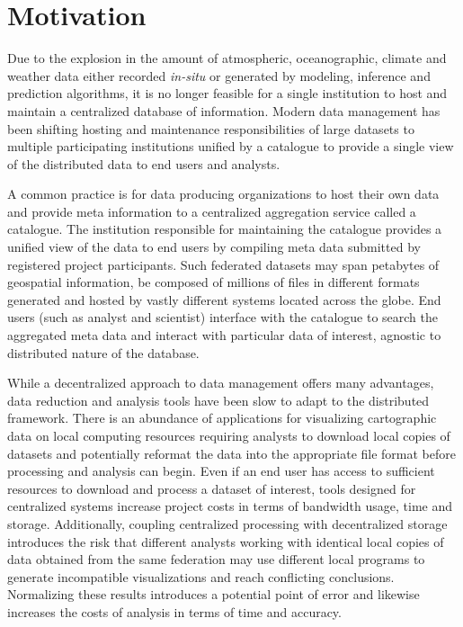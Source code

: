 \section{Motivation}
\label{sec:motivation}
Due to the explosion in the amount of atmospheric, oceanographic,
climate and weather data either recorded \emph{in-situ} or generated
by modeling, inference and prediction algorithms, it is no longer
feasible for a single institution to host and maintain a centralized
database of information. Modern data management has been shifting
hosting and maintenance responsibilities of large datasets to multiple
participating institutions unified by a catalogue to provide a single
view of the distributed data to end users and analysts.

A common practice is for data producing organizations to host their
own data and provide meta information to a centralized aggregation
service called a catalogue. The institution responsible for
maintaining the catalogue provides a unified view of the data to end
users by compiling meta data submitted by registered project
participants. Such federated datasets may span petabytes of geospatial
information, be composed of millions of files in different formats
generated and hosted by vastly different systems located across the
globe. End users (such as analyst and scientist) interface with the
catalogue to search the aggregated meta data and interact with
particular data of interest, agnostic to distributed nature of the
database.

While a decentralized approach to data management offers many
advantages, data reduction and analysis tools have been slow to adapt
to the distributed framework. There is an abundance of applications
for visualizing cartographic data on local computing resources
requiring analysts to download local copies of datasets and
potentially reformat the data into the appropriate file format before
processing and analysis can begin. Even if an end user has access to
sufficient resources to download and process a dataset of interest,
tools designed for centralized systems increase project costs in terms
of bandwidth usage, time and storage. Additionally, coupling
centralized processing with decentralized storage introduces the risk
that different analysts working with identical local copies of data
obtained from the same federation may use different local programs to
generate incompatible visualizations and reach conflicting
conclusions. Normalizing these results introduces a potential point of
error and likewise increases the costs of analysis in terms of time
and accuracy.

